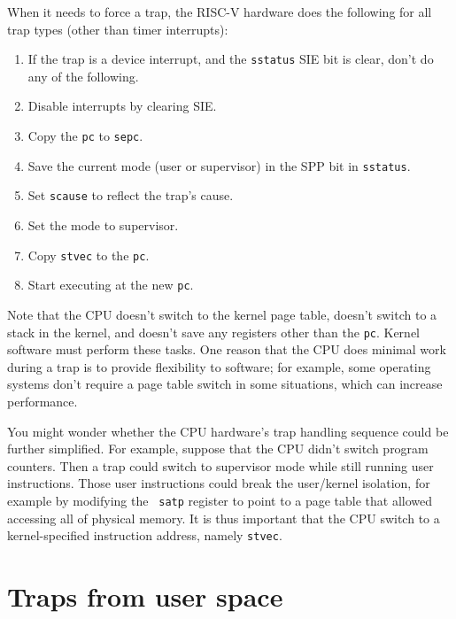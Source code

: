 When it needs to force a trap, the RISC-V hardware does the
following for all trap types (other than timer interrupts):

\begin{enumerate}

\item If the trap is a device interrupt, and the {\tt sstatus} SIE bit
  is clear, don't do any of the following.

\item Disable interrupts by clearing SIE.

\item Copy the {\tt pc} to {\tt sepc}.

\item Save the current mode (user or supervisor) in the SPP bit in {\tt sstatus}.

\item Set {\tt scause} to reflect the trap's cause.

\item Set the mode to supervisor.

\item Copy {\tt stvec} to the {\tt pc}.

\item Start executing at the new {\tt pc}.

\end{enumerate}

Note that the CPU doesn't switch to the kernel page table, doesn't
switch to a stack in the kernel, and doesn't save any registers other
than the {\tt pc}. Kernel software must perform these tasks.
One reason that the CPU does minimal work during a trap is to provide
flexibility to software; for example, some operating systems don't
require a page table switch in some situations, which can increase
performance.

You might wonder whether the CPU hardware's trap handling sequence
could be further simplified. For example, suppose that the CPU didn't
switch program counters. Then a trap could switch to supervisor mode
while still running user instructions. Those user instructions could
break the user/kernel isolation, for example by modifying the {\tt
  satp} register to point to a page table that allowed accessing all
of physical memory. It is thus important that the CPU switch to a
kernel-specified instruction address, namely {\tt stvec}.

\section{Traps from user space}

